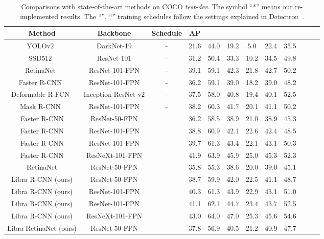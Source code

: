 \documentclass[10pt,twocolumn,letterpaper]{article}
\begin{document}
\begin{table*}[htb]
	\centering
	\caption{Comparisons with state-of-the-art methods on COCO \emph{test-dev}.
	  The symbol ``*'' means our re-implemented results.
	  The ``'', ``'' training schedules follow the settings explained in Detectron~\cite{Detectron2018}.}
	\vspace{-5pt}
	\addtolength{\tabcolsep}{1pt}
	\begin{tabular}{*{12}{c}}
		\toprule
		Method                       & Backbone  & Schedule   &  AP &  &  &  &  &   \\
		\midrule
		YOLOv2~\cite{yolo9000} & DarkNet-19 & - & 21.6 & 44.0 & 19.2 & 5.0 & 22.4 & 35.5\\
		SSD512~\cite{ssd} & ResNet-101 & - & 31.2 & 50.4 & 33.3 & 10.2 & 34.5 & 49.8 \\
		RetinaNet~\cite{focalloss} & ResNet-101-FPN & -  & 39.1 & 59.1 & 42.3 & 21.8 & 42.7 & 50.2 \\
		Faster R-CNN~\cite{fpn} & ResNet-101-FPN & - & 36.2 & 59.1 & 39.0 & 18.2 & 39.0 & 48.2 \\
		Deformable R-FCN~\cite{rfcn} & Inception-ResNet-v2 & -  & 37.5 & 58.0 & 40.8 & 19.4 & 40.1 & 52.5 \\
		Mask R-CNN~\cite{maskrcnn} & ResNet-101-FPN & - & 38.2 & 60.3 & 41.7 & 20.1 & 41.1 & 50.2 \\
		\midrule
		Faster R-CNN & ResNet-50-FPN &  & 36.2 & 58.5 & 38.9 & 21.0 & 38.9 & 45.3            \\
		Faster R-CNN & ResNet-101-FPN &  & 38.8 & 60.9 & 42.1 & 22.6 & 42.4 & 48.5         \\
		Faster R-CNN & ResNet-101-FPN &  & 39.7 & 61.3 & 43.4 & 22.1 & 43.1 & 50.3           \\
		Faster R-CNN & ResNeXt-101-FPN &  & 41.9 & 63.9 & 45.9 & 25.0 & 45.3 & 52.3 \\
		RetinaNet & ResNet-50-FPN &  & 35.8 & 55.3 & 38.6 & 20.0 & 39.0 & 45.1  \\
		\midrule
		Libra R-CNN (ours) & ResNet-50-FPN &  & 38.7 & 59.9 & 42.0 & 22.5 & 41.1 & 48.7 \\
		Libra R-CNN (ours) & ResNet-101-FPN &  & 40.3 & 61.3 & 43.9 & 22.9 & 43.1 & 51.0 \\
		Libra R-CNN (ours) & ResNet-101-FPN &  & 41.1 & 62.1 & 44.7 & 23.4 & 43.7 & 52.5 \\
		Libra R-CNN (ours) & ResNeXt-101-FPN  &  & 43.0 & 64.0 & 47.0 & 25.3 & 45.6 & 54.6 \\
		Libra RetinaNet (ours) & ResNet-50-FPN &  & 37.8 & 56.9 & 40.5 & 21.2 & 40.9 & 47.7  \\
		\bottomrule
	\end{tabular}
	\vspace{-5pt}
	\label{tab:overall-results}
\end{table*}
\end{document}
